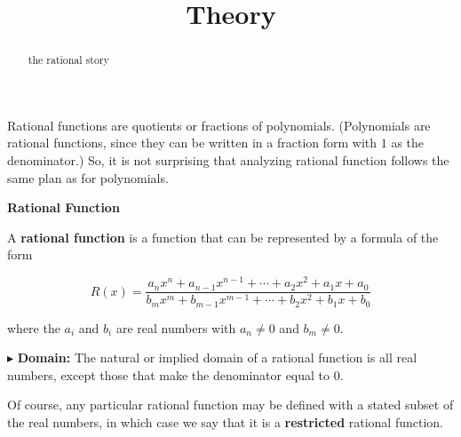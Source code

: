 \documentclass{ximera}
\title{Theory}
\begin{document}
\begin{abstract}
the rational story
\end{abstract}
\maketitle









Rational functions are quotients or fractions of polynomials.  (Polynomials are rational functions, since they can be written in a fraction form with $1$ as the denominator.)  So, it is not surprising that analyzing rational function follows the same plan as for polynomials.



















\begin{definition} \item \textbf{\textcolor{green!50!black}{Rational Function}}  


A \textbf{rational function} is a function that can be represented by a formula of the form


\[   R(x) = \frac{a_n x^n + a_{n-1} x^{n-1} + \cdots + a_2 x^2 + a_1 x + a_0}{b_m x^m + b_{m-1} x^{m-1} + \cdots + b_2 x^2 + b_1 x + b_0}        \]

where the $a_i$ and $b_i$ are real numbers with $a_n \ne 0$ and $b_m \ne 0$.


\end{definition}



$\blacktriangleright$ \textbf{\textcolor{red!10!blue!90!}{Domain:}}  The natural or implied domain of a rational function is all real numbers, except those that make the denominator equal to $0$.  



Of course, any particular rational function may be defined with a stated subset of the real numbers, in which case we  say that it is a \textbf{restricted} rational function.
\end{document}
